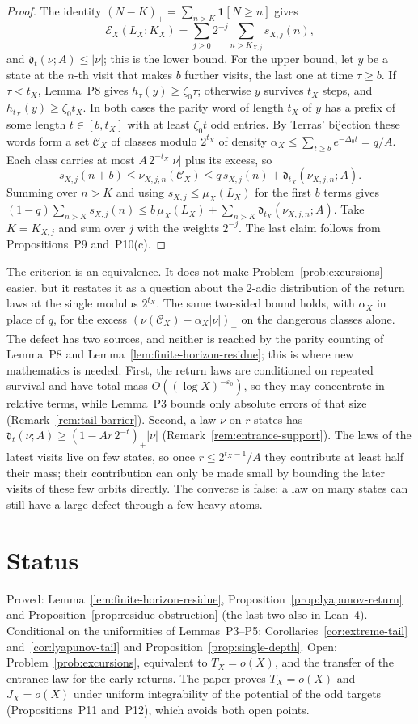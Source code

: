 \documentclass[11pt]{article}
\theoremstyle{remark}
\begin{document}
\begin{proof}
The identity $(N-K)_+=\sum_{n>K}\mathbf 1[N\ge n]$ gives
\[
 \mathcal E_X(L_X;K_X)=\sum_{j\ge0}2^{-j}\sum_{n>K_{X,j}}s_{X,j}(n),
\]
and $\mathfrak d_t(\nu;A)\le|\nu|$; this is the lower bound. For the upper bound, let $y$ be a state at the $n$-th visit that makes $b$ further visits, the last one at time $\tau\ge b$. If $\tau<t_X$, Lemma~P8 gives $h_\tau(y)\ge\zeta_0\tau$; otherwise $y$ survives $t_X$ steps, and $h_{t_X}(y)\ge\zeta_0t_X$. In both cases the parity word of length $t_X$ of $y$ has a prefix of some length $t\in[b,t_X]$ with at least $\zeta_0t$ odd entries. By Terras' bijection these words form a set $\mathcal C_X$ of classes modulo $2^{t_X}$ of density $\alpha_X\le\sum_{t\ge b}e^{-\Delta_0t}=q/A$. Each class carries at most $A\,2^{-t_X}|\nu|$ plus its excess, so
\[
 s_{X,j}(n+b)\le\nu_{X,j,n}(\mathcal C_X)\le q\,s_{X,j}(n)+\mathfrak d_{t_X}(\nu_{X,j,n};A).
\]
Summing over $n>K$ and using $s_{X,j}\le\mu_X(L_X)$ for the first $b$ terms gives $(1-q)\sum_{n>K}s_{X,j}(n)\le b\,\mu_X(L_X)+\sum_{n>K}\mathfrak d_{t_X}(\nu_{X,j,n};A)$. Take $K=K_{X,j}$ and sum over $j$ with the weights $2^{-j}$. The last claim follows from Propositions~P9 and~P10(c).
\end{proof}

The criterion is an equivalence. It does not make Problem~\ref{prob:excursions} easier, but it restates it as a question about the $2$-adic distribution of the return laws at the single modulus $2^{t_X}$. The same two-sided bound holds, with $\alpha_X$ in place of $q$, for the excess $(\nu(\mathcal C_X)-\alpha_X|\nu|)_+$ on the dangerous classes alone. The defect has two sources, and neither is reached by the parity counting of Lemma~P8 and Lemma~\ref{lem:finite-horizon-residue}; this is where new mathematics is needed. First, the return laws are conditioned on repeated survival and have total mass $O((\log X)^{-\varepsilon_0})$, so they may concentrate in relative terms, while Lemma~P3 bounds only absolute errors of that size (Remark~\ref{rem:tail-barrier}). Second, a law $\nu$ on $r$ states has $\mathfrak d_t(\nu;A)\ge(1-Ar\,2^{-t})_+|\nu|$ (Remark~\ref{rem:entrance-support}). The laws of the latest visits live on few states, so once $r\le2^{t_X-1}/A$ they contribute at least half their mass; their contribution can only be made small by bounding the later visits of these few orbits directly. The converse is false: a law on many states can still have a large defect through a few heavy atoms.

\section{Status}
Proved: Lemma~\ref{lem:finite-horizon-residue}, Proposition~\ref{prop:lyapunov-return} and Proposition~\ref{prop:residue-obstruction} (the last two also in Lean~4). Conditional on the uniformities of Lemmas~P3--P5: Corollaries~\ref{cor:extreme-tail} and~\ref{cor:lyapunov-tail} and Proposition~\ref{prop:single-depth}. Open: Problem~\ref{prob:excursions}, equivalent to $T_X=o(X)$, and the transfer of the entrance law for the early returns. The paper proves $T_X=o(X)$ and $J_X=o(X)$ under uniform integrability of the potential of the odd targets (Propositions~P11 and~P12), which avoids both open points.



\end{document}
